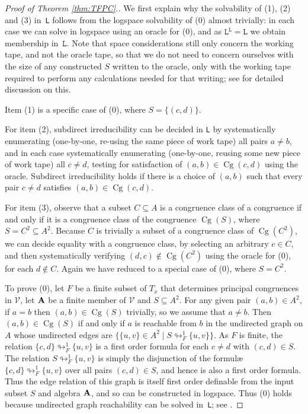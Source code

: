 \documentclass[10pt,a4paper]{amsart}
\theoremstyle{plain}
\theoremstyle{definition}
\newcommand{\collapse}{\looparrowright}
\newcommand{\Cg}{\operatorname{Cg}}
\begin{document}
\begin{proof}[Proof of Theorem \ref{thm:TFPC}.]
We first explain why the solvability of (1), (2) and (3) in~\texttt{L} follows from the logspace solvability of (0) almost trivially: in each case we can solve in logspace using an oracle for (0), and as $\texttt{L}^\texttt{L}=\texttt{L}$ we obtain membership in~$\texttt{L}$.  Note that space considerations still only concern the working tape, and not the oracle tape, so that we do not need to concern ourselves with the size of any constructed $S$ written to the oracle, only with the working tape required to perform any calculations needed for that writing; see \cite[Section~6.2]{BDJN} for detailed discussion on this.

Item (1) is a specific case of (0), where $S=\{(c,d)\}$.  

For item (2), subdirect irreducibility can be decided in \texttt{L} by  systematically enumerating (one-by-one, re-using the same piece of work tape) all pairs $a\neq b$, and in each case systematically enumerating (one-by-one, reusing some new piece of work tape) all $c\neq d$, testing for satisfaction of $(a,b)\in\Cg(c,d)$ using the oracle.  Subdirect irreducibility holds if there is a choice of $(a,b)$ such that every pair $c\neq d$ satisfies $(a,b)\in\Cg(c,d)$.

For item (3), observe that a subset $C\subseteq A$ is a congruence class of a congruence if and only if it is a congruence class of the congruence $\Cg(S)$, where $S=C^2\subseteq A^2$.  
Because $C$ is trivially a subset of a congruence class of $\Cg(C^2)$, we can decide equality with a congruence class, by selecting an arbitrary $c\in C$, and then systematically verifying $(d,c)\notin \Cg(C^2)$ using the oracle for (0), for each $d\notin C$.  
Again we have reduced to a special case of (0), where $S=C^2$.

To prove (0), let $F$ be a finite subset of $T_x$ that determines principal congruences in $\mathscr{V}$, let ${\bf A}$ be a finite member of $\mathscr{V}$ and $S\subseteq A^2$.  
For any given pair $(a,b)\in A^2$, if $a=b$ then $(a,b)\in \Cg(S)$ trivially, so we assume that $a\neq b$.  Then $(a,b)\in\Cg(S)$ if and only if $a$ is reachable from $b$ in the undirected graph on $A$ whose undirected edges are $\{\{u,v\}\in A^2\mid S\collapse^1_F\{u,v\}\}$.  
As $F$ is finite, the relation $\{c,d\}\collapse^1_F\{u,v\}$ is a first order formula for each $c\neq d$ with $(c,d)\in S$.  
The relation $S\collapse^1_F\{u,v\}$ is simply the disjunction of the formul{\ae} $\{c,d\}\collapse_F^1\{u,v\}$ over all pairs $(c,d)\in S$, and hence is also a first order formula.  
Thus the edge relation of this graph is itself first order definable from the input subset $S$ and algebra ${\bf A}$, and so can be constructed in logspace.  
Thus (0) holds because undirected graph reachability can be solved in~\texttt{L}; see \cite{rei,rei2}.
\end{proof}
\end{document}
